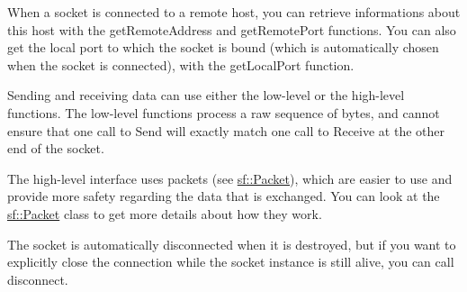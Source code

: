 When a socket is connected to a remote host, you can retrieve informations about this host with the get\-Remote\-Address and get\-Remote\-Port functions. You can also get the local port to which the socket is bound (which is automatically chosen when the socket is connected), with the get\-Local\-Port function.

Sending and receiving data can use either the low-\/level or the high-\/level functions. The low-\/level functions process a raw sequence of bytes, and cannot ensure that one call to Send will exactly match one call to Receive at the other end of the socket.

The high-\/level interface uses packets (see \hyperlink{classsf_1_1_packet}{sf\-::\-Packet}), which are easier to use and provide more safety regarding the data that is exchanged. You can look at the \hyperlink{classsf_1_1_packet}{sf\-::\-Packet} class to get more details about how they work.

The socket is automatically disconnected when it is destroyed, but if you want to explicitly close the connection while the socket instance is still alive, you can call disconnect.

